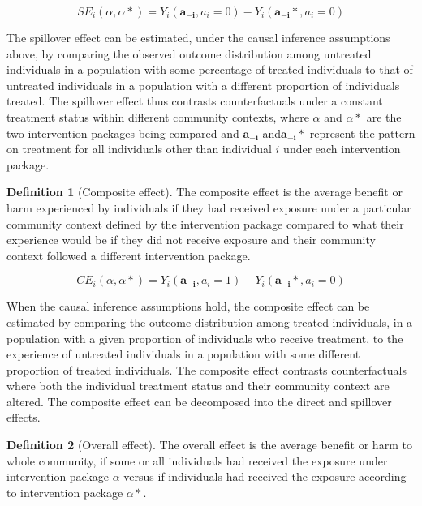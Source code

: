 \documentclass{article}
\theoremstyle{definition}
\newtheorem{definition}{Definition}[section]
\begin{document}
\begin{equation}\label{eq:2}
   SE_{i}\left(\alpha,\alpha*\right) = Y_{i}\left(\mathbf{a_{-i}}, a_{i} = 0\right) - Y_{i}\left(\mathbf{a_{-i}*}, a_{i} = 0\right)	
\end{equation}

The spillover effect can be estimated, under the causal inference assumptions above, by comparing the observed outcome distribution among untreated individuals in a population with some percentage of treated individuals to that of untreated individuals in a population with a different proportion of individuals treated. The spillover effect thus contrasts counterfactuals under a constant treatment status within different community contexts, where $\alpha$ and $\alpha*$ are the two intervention packages being compared and $\mathbf{a_{-i}}$ and$\mathbf{a_{-i}}*$ represent the pattern on treatment for all individuals other than individual $i$ under each intervention package.


	
\begin{definition}[Composite effect]The composite effect is the average benefit or harm experienced by individuals if they had received exposure under a particular community context defined by the intervention package compared to what their experience would be if they did not receive exposure and their community context followed a different intervention package.
\end{definition}

\begin{equation}\label{eq:3}
   CE_{i}\left(\alpha,\alpha*\right) = Y_{i}\left(\mathbf{a_{-i}}, a_{i} = 1\right) - Y_{i}\left(\mathbf{a_{-i}*}, a_{i} = 0\right)	
\end{equation}

When the causal inference assumptions hold, the composite effect can be estimated by comparing the outcome distribution among treated individuals, in a population with a given proportion of individuals who receive treatment, to the experience of untreated individuals in a population with some different proportion of treated individuals. The composite effect contrasts counterfactuals where both the individual treatment status and their community context are altered. The composite effect can be decomposed into the direct and spillover effects.



\begin{definition}[Overall effect] The overall effect is the average benefit or harm to whole community, if some or all individuals had received the exposure under intervention package $\alpha$ versus if individuals had received the exposure according to intervention package $\alpha*$.
\end{definition}
\end{document}
